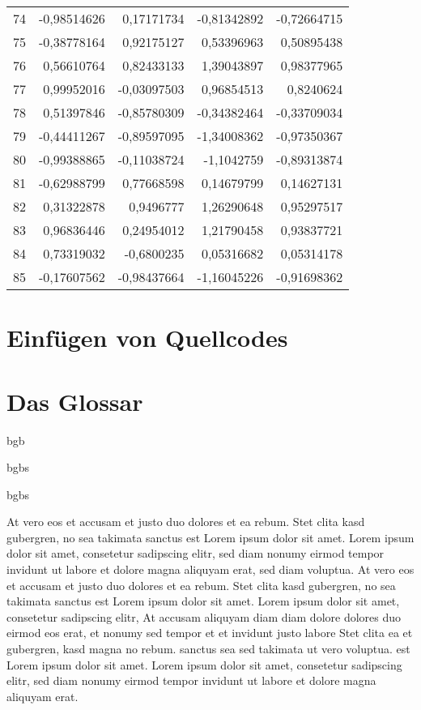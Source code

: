 \begin{longtable}{lrrrr}
 74 & -0,98514626 & 0,17171734 & -0,81342892 & -0,72664715 \\
 75 & -0,38778164 & 0,92175127 & 0,53396963 & 0,50895438 \\
 76 & 0,56610764 & 0,82433133 & 1,39043897 & 0,98377965 \\
 77 & 0,99952016 & -0,03097503 & 0,96854513 &  0,8240624 \\
 78 & 0,51397846 & -0,85780309 & -0,34382464 & -0,33709034 \\
 79 & -0,44411267 & -0,89597095 & -1,34008362 & -0,97350367 \\
 80 & -0,99388865 & -0,11038724 & -1,1042759 & -0,89313874 \\
 81 & -0,62988799 & 0,77668598 & 0,14679799 & 0,14627131 \\
 82 & 0,31322878 &  0,9496777 & 1,26290648 & 0,95297517 \\
 83 & 0,96836446 & 0,24954012 & 1,21790458 & 0,93837721 \\
 84 & 0,73319032 & -0,6800235 & 0,05316682 & 0,05314178 \\
 85 & -0,17607562 & -0,98437664 & -1,16045226 & -0,91698362 \\
\end{longtable}


\section{Einfügen von Quellcodes}\label{sec:listings}



\section{Das Glossar}\label{sec:glossary}

\Gls{bgb}


\glspl{bgb}

\Glspl{bgb}



At vero eos et accusam et justo duo dolores et ea rebum. Stet clita kasd gubergren, no sea takimata sanctus est Lorem ipsum dolor sit amet. Lorem ipsum dolor sit amet, consetetur sadipscing elitr, sed diam nonumy eirmod tempor invidunt ut labore et dolore magna aliquyam erat, sed diam voluptua. At vero eos et accusam et justo duo dolores et ea rebum. Stet clita kasd gubergren, no sea takimata sanctus est Lorem ipsum dolor sit amet. Lorem ipsum dolor sit amet, consetetur sadipscing elitr, At accusam aliquyam diam diam dolore dolores duo eirmod eos erat, et nonumy sed tempor et et invidunt justo labore Stet clita ea et gubergren, kasd magna no rebum. sanctus sea sed takimata ut vero voluptua. est Lorem ipsum dolor sit amet. Lorem ipsum dolor sit amet, consetetur sadipscing elitr, sed diam nonumy eirmod tempor invidunt ut labore et dolore magna aliquyam erat.   

